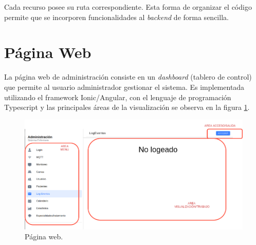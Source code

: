 Cada recurso posee su ruta correspondiente. Esta forma de organizar el código permite que se incorporen funcionalidades al \textit{backend} de forma sencilla.

\pagebreak

\section{Página Web}

La página web de administración consiste en un \textit{dashboard} (tablero de control) que permite al usuario administrador gestionar el sistema.
Es implementada utilizando el framework Ionic/Angular, con el lenguaje de programación Typescript y las principales áreas de la visualización se observa en la figura \ref{fig:Página web}.

\begin{figure}[ht]
	\centering
	\includegraphics[scale=.48]{./Figures/pagina-web.png}
	\caption{Página web.}
	\label{fig:Página web}
\end{figure}

